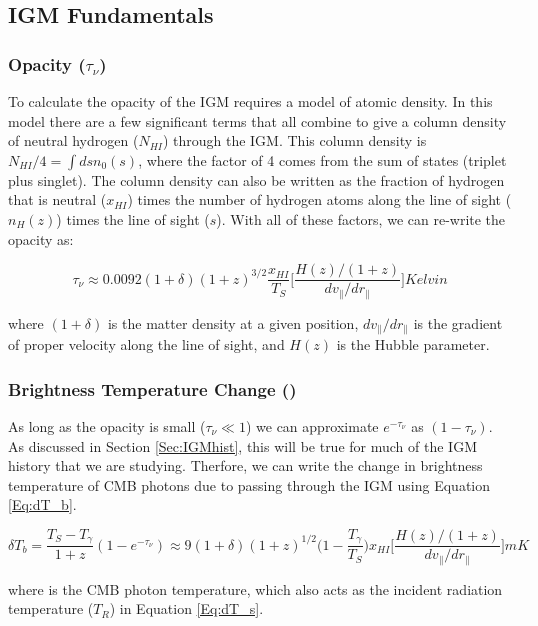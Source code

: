 \subsection{IGM Fundamentals}
\subsubsection{Opacity ($\tau_\nu$)}
To calculate the opacity of the IGM requires a model of atomic density. In this model there are a few significant terms that all combine to give a column density of neutral hydrogen ($N_{HI}$) through the IGM. This column density is $N_{HI}/4 = \int ds n_0 (s)$, where the factor of 4 comes from the sum of states (triplet plus singlet). The column density can also be written as the fraction of hydrogen that is neutral ($x_{HI}$) times the number of hydrogen atoms along the line of sight ($n_H (z)$) times the line of sight ($s$). With all of these factors, we can re-write the opacity as:

\begin{equation}
\tau_{\nu} \approx 0.0092 (1+\delta) (1+z)^{3/2} \frac{x_{HI}}{T_S} \Big[ \frac{H(z)/(1+z)}{dv_{\parallel}/dr_{\parallel}} \Big] Kelvin
\end{equation} 

where $(1+\delta)$ is the matter density at a given position, $dv_{\parallel}/dr_{\parallel}$ is the gradient of proper velocity along the line of sight, and $H(z)$ is the Hubble parameter. 

\subsubsection{Brightness Temperature Change (\dtb)}
As long as the opacity is small ($\tau_\nu \ll 1$) we can approximate $e^{-\tau_\nu}$ as $(1-\tau_\nu)$. As discussed in Section \ref{Sec:IGMhist}, this will be true for much of the IGM history that we are studying. Therfore, we can write the change in brightness temperature of CMB photons due to passing through the IGM using Equation \ref{Eq:dT_b}.

\begin{equation}\label{Eq:dT_b}
\delta T_b = \frac{T_S - T_\gamma}{1+z}(1-e^{-\tau_\nu}) \approx 9 (1+\delta) (1+z)^{1/2} \Big(1-\frac{T_\gamma}{T_S}\Big) x_{HI} \Big[ \frac{H(z)/(1+z)}{dv_{\parallel}/dr_{\parallel}} \Big] mK
\end{equation}

where \tg is the CMB photon temperature, which also acts as the incident radiation temperature ($T_R$) in Equation \ref{Eq:dT_s}. 

